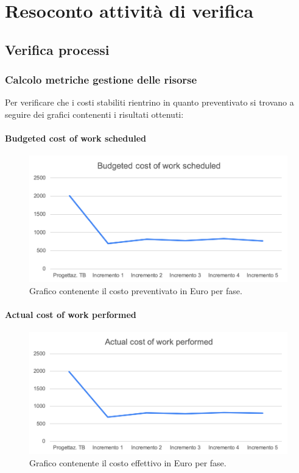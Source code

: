 \appendix
{}

\section{Resoconto attività di verifica}
	
\subsection{Verifica processi}

\subsubsection{Calcolo metriche gestione delle risorse}
Per verificare che i costi stabiliti rientrino in quanto preventivato si trovano a seguire dei grafici contenenti i risultati ottenuti:

	\paragraph{Budgeted cost of work scheduled}
		\begin{figure}[H]
			\centering
			\includegraphics[width=0.8\linewidth]{./res/images/BCWS_1.png}
			\caption{Grafico contenente il costo preventivato in Euro per fase.}
			\label{fig:Grafico contenente il costo preventivato in Euro per fase.}
		\end{figure}

	\paragraph{Actual cost of work performed}
		\begin{figure}[H]
			\centering
			\includegraphics[width=0.8\linewidth]{./res/images/ACWP_1.png}
			\caption{Grafico contenente il costo effettivo in Euro per fase.}
			\label{fig:Grafico contenente il costo effettivo in Euro per fase.}
		\end{figure}

